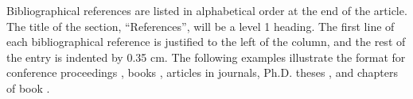 \documentclass[10pt, a4paper]{article}
\begin{document}
Bibliographical references are listed in alphabetical order at the end of the article. The title of the section, ``References'', will be a level 1 heading. The first line of each bibliographical reference is justified to the left of the column, and the rest of the entry is indented by 0.35 cm. The following examples illustrate the format for conference proceedings \cite{chave-64}, books \cite{butcher-81}, articles \cite{howells-51} in journals, Ph.D. theses \cite{croft-78}, and chapters of book \cite{feigl-58}.



 
\end{document}
